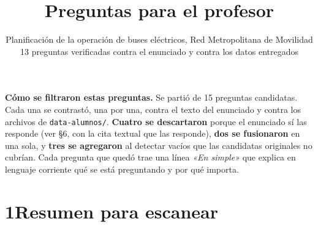 \documentclass[11pt,a4paper,parskip=half]{scrartcl}
\title{Preguntas para el profesor}
\subtitle{\normalsize Planificación de la operación de buses eléctricos, Red Metropolitana de Movilidad\\[2pt]
13 preguntas verificadas contra el enunciado y contra los datos entregados}
\author{}
\date{}
\begin{document}
\maketitle
\vspace{-2.2\baselineskip}

\begin{nota}
\textbf{\textcolor{ink}{Cómo se filtraron estas preguntas.}} Se partió de 15 preguntas candidatas. Cada una se contrastó, una por una, contra el texto del enunciado y contra los archivos de \texttt{data-alumnos/}. \textbf{Cuatro se descartaron} porque el enunciado sí las responde (ver §6, con la cita textual que las responde), \textbf{dos se fusionaron} en una sola, y \textbf{tres se agregaron} al detectar vacíos que las candidatas originales no cubrían. Cada pregunta que quedó trae una línea \textit{«En simple»} que explica en lenguaje corriente qué se está preguntando y por qué importa.
\end{nota}

\section*{1\quad Resumen para escanear}
\end{document}
